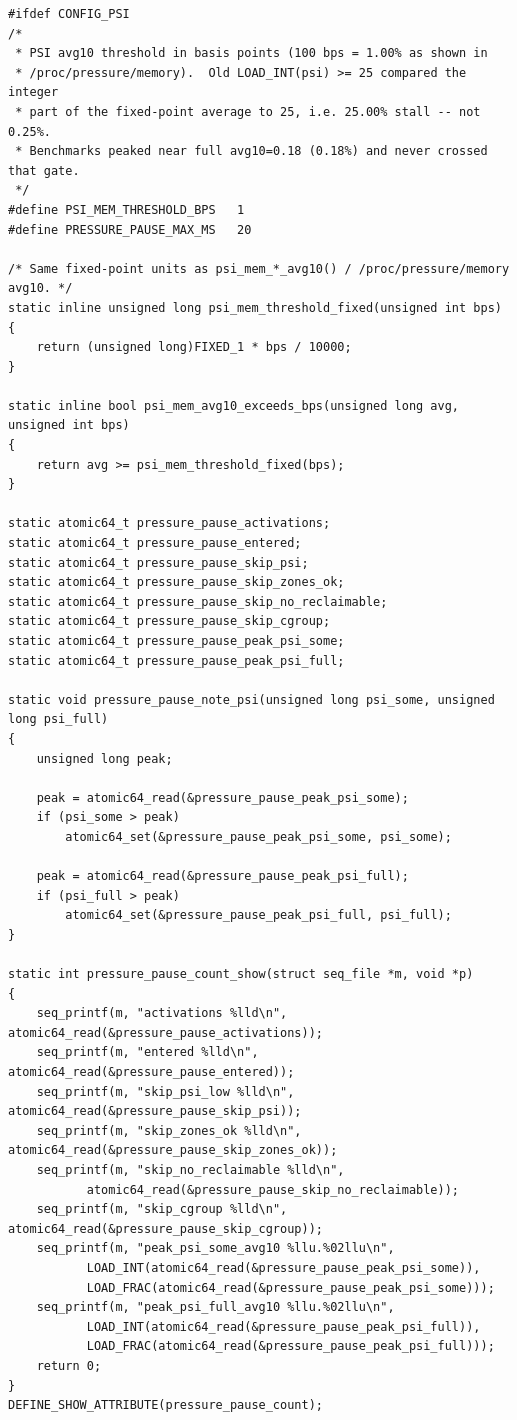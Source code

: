 \documentclass[12pt,a4paper]{article}
\begin{document}
\begin{codebox}
\begin{lstlisting}[style=cstyle]
#ifdef CONFIG_PSI
/*
 * PSI avg10 threshold in basis points (100 bps = 1.00% as shown in
 * /proc/pressure/memory).  Old LOAD_INT(psi) >= 25 compared the integer
 * part of the fixed-point average to 25, i.e. 25.00% stall -- not 0.25%.
 * Benchmarks peaked near full avg10=0.18 (0.18%) and never crossed that gate.
 */
#define PSI_MEM_THRESHOLD_BPS	1
#define PRESSURE_PAUSE_MAX_MS	20

/* Same fixed-point units as psi_mem_*_avg10() / /proc/pressure/memory avg10. */
static inline unsigned long psi_mem_threshold_fixed(unsigned int bps)
{
	return (unsigned long)FIXED_1 * bps / 10000;
}

static inline bool psi_mem_avg10_exceeds_bps(unsigned long avg, unsigned int bps)
{
	return avg >= psi_mem_threshold_fixed(bps);
}

static atomic64_t pressure_pause_activations;
static atomic64_t pressure_pause_entered;
static atomic64_t pressure_pause_skip_psi;
static atomic64_t pressure_pause_skip_zones_ok;
static atomic64_t pressure_pause_skip_no_reclaimable;
static atomic64_t pressure_pause_skip_cgroup;
static atomic64_t pressure_pause_peak_psi_some;
static atomic64_t pressure_pause_peak_psi_full;

static void pressure_pause_note_psi(unsigned long psi_some, unsigned long psi_full)
{
	unsigned long peak;

	peak = atomic64_read(&pressure_pause_peak_psi_some);
	if (psi_some > peak)
		atomic64_set(&pressure_pause_peak_psi_some, psi_some);

	peak = atomic64_read(&pressure_pause_peak_psi_full);
	if (psi_full > peak)
		atomic64_set(&pressure_pause_peak_psi_full, psi_full);
}

static int pressure_pause_count_show(struct seq_file *m, void *p)
{
	seq_printf(m, "activations %lld\n", atomic64_read(&pressure_pause_activations));
	seq_printf(m, "entered %lld\n", atomic64_read(&pressure_pause_entered));
	seq_printf(m, "skip_psi_low %lld\n", atomic64_read(&pressure_pause_skip_psi));
	seq_printf(m, "skip_zones_ok %lld\n", atomic64_read(&pressure_pause_skip_zones_ok));
	seq_printf(m, "skip_no_reclaimable %lld\n",
		   atomic64_read(&pressure_pause_skip_no_reclaimable));
	seq_printf(m, "skip_cgroup %lld\n", atomic64_read(&pressure_pause_skip_cgroup));
	seq_printf(m, "peak_psi_some_avg10 %llu.%02llu\n",
		   LOAD_INT(atomic64_read(&pressure_pause_peak_psi_some)),
		   LOAD_FRAC(atomic64_read(&pressure_pause_peak_psi_some)));
	seq_printf(m, "peak_psi_full_avg10 %llu.%02llu\n",
		   LOAD_INT(atomic64_read(&pressure_pause_peak_psi_full)),
		   LOAD_FRAC(atomic64_read(&pressure_pause_peak_psi_full)));
	return 0;
}
DEFINE_SHOW_ATTRIBUTE(pressure_pause_count);


\end{lstlisting}
\end{codebox}
\end{document}
